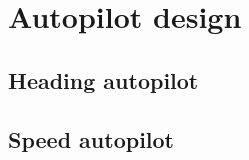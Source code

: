 \section{Autopilot design}\label{sec:prob1}

\subsection{Heading autopilot}

\subsection{Speed autopilot}
